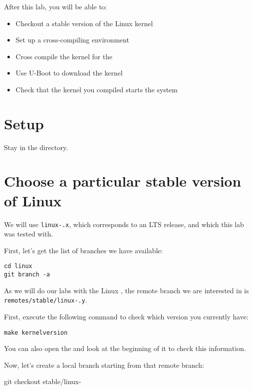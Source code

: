 
After this lab, you will be able to:
\begin{itemize}
\item Checkout a stable version of the Linux kernel
\item Set up a cross-compiling environment
\item Cross compile the kernel for the \labboarddescription
\item Use U-Boot to download the kernel
\item Check that the kernel you compiled starts the system
\end{itemize}

\section{Setup}

Stay in the  directory.

\section{Choose a particular stable version of Linux}

We will use \texttt{linux-\workingkernel.x}, which corresponds to an
LTS release, and which this lab was tested with.

First, let's get the list of branches we have available:

\begin{verbatim}
cd linux
git branch -a
\end{verbatim}

As we will do our labs with the Linux \workingkernel,
the remote branch we are interested in is
\texttt{remotes/stable/linux-\workingkernel.y}.

First, execute the following command to check which version you
currently have:

\begin{verbatim}
make kernelversion
\end{verbatim}

You can also open the  and look at the beginning of it
to check this information.

Now, let's create a local branch starting from that remote branch:
\begin{bashinput}
git checkout stable/linux-%
\end{bashinput}

